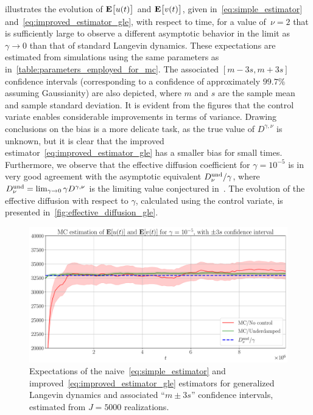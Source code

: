 \documentclass[11pt,a4paper]{article}
\begin{document}
 illustrates the evolution of $\mathbf{E} \bigl[ u(t) \bigr]$ and $\mathbf{E} \bigl[ v(t) \bigr]$,
given in~\eqref{eq:simple_estimator} and~\eqref{eq:improved_estimator_gle},
with respect to time,
for a value of~$\nu = 2$ that is sufficiently large to observe a different asymptotic behavior in the limit as $\gamma \to 0$ than that of standard Langevin dynamics.
These expectations are estimated from simulations using the same parameters as in~\cref{table:parameters_employed_for_mc}.
The associated $[m - 3 s, m + 3 s]$ confidence intervals (corresponding to a confidence of approximately $99.7\%$ assuming Gaussianity) are also depicted,
where $m$ and $s$ are the sample mean and sample standard deviation.
It is evident from the figures that the control variate enables considerable improvements in terms of variance.
Drawing conclusions on the bias is a more delicate task,
as the true value of $D^{\gamma, \nu}$ is unknown,
but it is clear that the improved estimator~\eqref{eq:improved_estimator_gle} has a smaller bias for small times.
Furthermore, we observe that the effective diffusion coefficient for $\gamma = 10^{-5}$
is in very good agreement with the asymptotic equivalent $D^{\rm und}_{\nu}/\gamma$,
where $D^{\rm und}_{\nu} = \lim_{\gamma \to 0} \gamma D^{\gamma, \nu}$ is the limiting value conjectured in~\cite{GPGSUV21}.
The evolution of the effective diffusion with respect to $\gamma$,
calculated using the control variate, is presented in~\cref{fig:effective_diffusion_gle}.
\begin{figure}[ht]
    \centering
    \includegraphics[width=0.8\linewidth]{figures/time-gle-5.pdf}
    \caption{%
        Expectations of the naive~\eqref{eq:simple_estimator} and improved~\eqref{eq:improved_estimator_gle} estimators for generalized Langevin dynamics
        and associated ``$m \pm 3 s$'' confidence intervals,
        estimated from $J = 5000$ realizations.
    }
    \label{fig:effective_diffusion_time_gle}
\end{figure}
\end{document}
